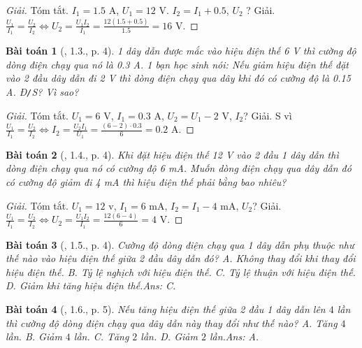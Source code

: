 \documentclass{article}
\newtheorem{baitoan}{Bài toán}
\begin{document}
\begin{proof}[Giải]
	\textsf{Tóm tắt.} $I_1 = 1.5$ A, $U_1 = 12$ V. $I_2 = I_1 + 0.5$, $U_2$ ? \textsf{Giải.} $\frac{U_1}{I_1} = \frac{U_2}{I_2}\Leftrightarrow U_2 = \frac{U_1I_2}{I_1} = \frac{12(1.5 + 0.5)}{1.5} = 16$ V.
\end{proof}

\begin{baitoan}[\cite{SBT_Vat_Ly_9}, 1.3., p. 4]
	1 dây dẫn được mắc vào hiệu điện thế \emph{6 V} thì cường độ dòng điện chạy qua nó là \emph{0.3 A}. 1 bạn học sinh nói: Nếu giảm hiệu điện thế đặt vào 2 đầu dây dẫn đi \emph{2 V} thì dòng điện chạy qua dây khi đó có cường độ là \emph{0.15 A}. \emph{Đ\texttt{/}S?} Vì sao?
\end{baitoan}

\begin{proof}[Giải]
	\textsf{Tóm tắt.} $U_1 = 6$ V, $I_1 = 0.3$ A, $U_2 = U_1 - 2$ V, $I_2$? \textsf{Giải.} S vì $\frac{U_1}{I_1} = \frac{U_2}{I_2}\Leftrightarrow I_2 = \frac{U_2I_1}{U_1} = \frac{(6 - 2)\cdot0.3}{6} = 0.2$ A.
\end{proof}

\begin{baitoan}[\cite{SBT_Vat_Ly_9}, 1.4., p. 4]
	Khi đặt hiệu điện thế \emph{12 V} vào 2 đầu 1 dây dẫn thì dòng điện chạy qua nó có cường độ \emph{6 mA}. Muốn dòng điện chạy qua dây dẫn đó có cường độ giảm đi \emph{4 mA} thì hiệu điện thế phải bằng bao nhiêu?
\end{baitoan}

\begin{proof}[Giải]
	\textsf{Tóm tắt.} $U_1 = 12$ v, $I_1 = 6$ mA, $I_2 = I_1 - 4$ mA, $U_2$? \textsf{Giải.} $\frac{U_1}{I_1} = \frac{U_2}{I_2}\Leftrightarrow U_2 = \frac{U_1I_2}{I_1} = \frac{12(6 - 4)}{6} = 4$ V.
\end{proof}

\begin{baitoan}[\cite{SBT_Vat_Ly_9}, 1.5., p. 4]
	Cường độ dòng điện chạy qua 1 dây dẫn phụ thuộc như thế nào vào hiệu điện thế giữa 2 đầu dây dẫn đó? {\sf A.} Không thay đổi khi thay đổi hiệu điện thế. {\sf B.} Tỷ lệ nghịch với hiệu điện thế. {\sf C.} Tỷ lệ thuận với hiệu điện thế. {\sf D.} Giảm khi tăng hiệu điện thế.\hfill{\sf Ans: C.}
\end{baitoan}

\begin{baitoan}[\cite{SBT_Vat_Ly_9}, 1.6., p. 5]
	Nếu tăng hiệu điện thế giữa 2 đầu 1 dây dẫn lên $4$ lần thì cường độ dòng điện chạy qua dây dẫn này thay đổi như thế nào? {\sf A.} Tăng $4$ lần. {\sf B.} Giảm $4$ lần. {\sf C.} Tăng $2$ lần. {\sf D.} Giảm $2$ lần.\hfill{\sf Ans: A.}
\end{baitoan}
\end{document}
